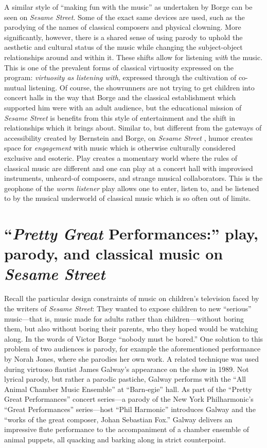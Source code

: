 \documentclass[12pt,letterpaper]{article}
\newcommand{\ses}{\textit{Sesame Street }}
\begin{document}
	A similar style of ``making fun with the music'' as undertaken by 
	Borge can be seen on \textit{Sesame Street}. Some of the exact same 
	devices are used, such as the parodying of the names of classical 
	composers and physical clowning. More significantly, however, there is 
	a shared sense of using
	parody to uphold the aesthetic and cultural status of the music while
	changing the subject-object relationships around and within it. 
	These shifts allow for listening \textit{with} the music. This is one
	of the prevalent forms
	of classical virtuosity expressed on the program: \textit{virtuosity as 
	listening with}, expressed through the cultivation of co-mutual
	listening. Of course, the showrunners are not trying to
	get children into concert halls in the way that Borge and the
	classical establishment which supported him were with an adult 
	audience, but the educational mission of \ses
	is benefits from this style of entertainment and the shift in 
	relationships which it brings about. Similar to, but different from the
	gateways of
	accessibility created by Bernstein and Borge, on \ses, humor creates 
	space for \textit{engagement} with music which is otherwise culturally
	considered exclusive and esoteric. Play creates a momentary world 
	where the rules of classical music are different and one can play 
	at a concert hall with improvised instruments, unheard-of composers,
	and strange musical collaborators. This is the geophone of the
	\textit{worm listener} play allows one to enter, listen to, and be 
	listened to by the musical underworld of classical music which is so 
	often out of limits.

	\section*{``\textit{Pretty Great} Performances:'' play, parody, and 
	classical music on \ses}
	
	Recall the particular design constraints of music on children's
	television faced by the writers of \textit{Sesame Street}: 	
	They wanted to expose children to new ``serious'' music---that is, music
	made for adults rather than children---without boring
	them, but also without boring their parents, who they hoped would be 
	watching along. In the words of Victor Borge ``nobody must
	be bored.'' One solution to this problem of two audiences is parody,
	for example the aforementioned performance by Norah Jones, where she
	parodies her own work. A related technique was used during virtuoso 
	flautist James Galway's appearance on the show in 1989. Not lyrical 
	parody, but rather a parodic pastiche, Galway performs with the ``All 
	Animal Chamber Music Ensemble'' at ``Barn-egie'' hall. As part of the 
	``Pretty Great Performances'' concert series---a parody of the New York
	Philharmonic's ``Great Performances'' series---host ``Phil Harmonic'' 
	introduces Galway and the ``works of the great composer, Johan Sebastian
	Fox.'' Galway delivers an impressive flute 
	performance to the accompaniment of a chamber ensemble of animal 
	puppets, all quacking and barking along in strict 
	counterpoint.\autocite{Galway2}
\end{document}

